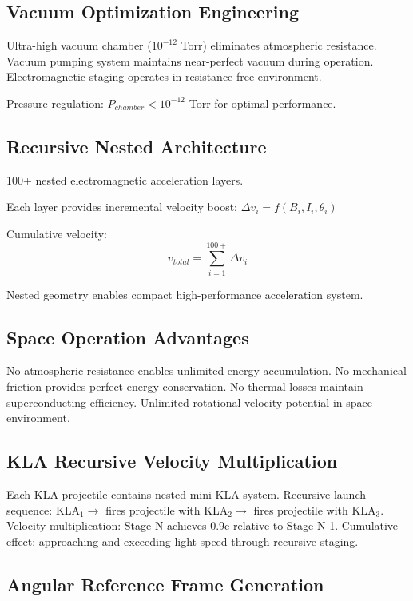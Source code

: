 \documentclass[12pt,a4paper]{article}
\begin{document}
\subsection{Vacuum Optimization Engineering}

Ultra-high vacuum chamber ($10^{-12}$ Torr) eliminates atmospheric resistance. Vacuum pumping system maintains near-perfect vacuum during operation. Electromagnetic staging operates in resistance-free environment.

Pressure regulation: $P_{chamber} < 10^{-12}$ Torr for optimal performance.

\subsection{Recursive Nested Architecture}

100+ nested electromagnetic acceleration layers.

Each layer provides incremental velocity boost: $\Delta v_i = f(B_i, I_i, \theta_i)$

Cumulative velocity:
\begin{equation}
v_{total} = \sum_{i=1}^{100+} \Delta v_i
\end{equation}

Nested geometry enables compact high-performance acceleration system.

\subsection{Space Operation Advantages}

No atmospheric resistance enables unlimited energy accumulation. No mechanical friction provides perfect energy conservation. No thermal losses maintain superconducting efficiency. Unlimited rotational velocity potential in space environment.

\subsection{KLA Recursive Velocity Multiplication}

Each KLA projectile contains nested mini-KLA system. Recursive launch sequence: KLA$_1 \rightarrow$ fires projectile with KLA$_2 \rightarrow$ fires projectile with KLA$_3$. Velocity multiplication: Stage N achieves 0.9c relative to Stage N-1. Cumulative effect: approaching and exceeding light speed through recursive staging.

\subsection{Angular Reference Frame Generation}
\end{document}
